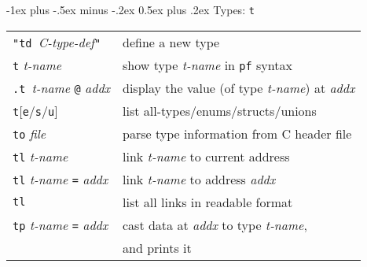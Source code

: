 \documentclass[a4paper,landscape]{article}
\makeatletter
\renewcommand{\section}{\@startsection{section}{1}{0mm}%
                                {-1ex plus -.5ex minus -.2ex}%
                                {0.5ex plus .2ex}%
                                {\normalfont\large\bfseries}}
\makeatother
\begin{document}
\begin{multicols*}{3}
\section{Types: \texttt{t}}
\begin{tabular}{@{}ll@{}}
\texttt{"td\ }\textit{C-type-def}\texttt{"} & define a new type \\
\texttt{t} \textit{t-name} & show type \textit{t-name} in \texttt{pf} syntax \\
\texttt{.t }\textit{t-name} \texttt{@} \textit{addx} & display the value (of type \textit{t-name}) at \textit{addx} \\
\texttt{t}[\texttt{e}/\texttt{s}/\texttt{u}] & list all-types/enums/structs/unions \\
\texttt{to} \textit{file} & parse type information from C header file \\
\texttt{tl} \textit{t-name} & link \textit{t-name} to current address \\
\texttt{tl} \textit{t-name} \texttt{=} \textit{addx} & link \textit{t-name} to address \textit{addx} \\
\texttt{tl} & list all links in readable format \\
\texttt{tp} \textit{t-name} \texttt{=} \textit{addx} & cast data at \textit{addx} to type \textit{t-name}, \\ & and prints it \\
\end{tabular}


\end{multicols*}
\end{document}
